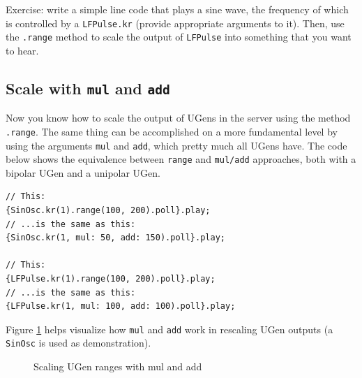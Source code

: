 Exercise: write a simple line code that plays a sine wave, the frequency of which is controlled by a \texttt{LFPulse.kr} (provide appropriate arguments to it). Then, use the \texttt{.range} method to scale the output of \texttt{LFPulse} into something that you want to hear. 

\subsection{Scale with \texttt{mul} and \texttt{add}}

Now you know how to scale the output of UGens in the server using the method \texttt{.range}. The same thing can be accomplished on a more fundamental level by using the arguments \texttt{mul} and \texttt{add}, which pretty much all UGens have. The code below shows the equivalence between \texttt{range} and \texttt{mul/add} approaches, both with a bipolar UGen and a unipolar UGen.

\begin{lstlisting}[style=SuperCollider-IDE, basicstyle=\scttfamily\footnotesize]
// This:
{SinOsc.kr(1).range(100, 200).poll}.play;
// ...is the same as this:
{SinOsc.kr(1, mul: 50, add: 150).poll}.play;

// This:
{LFPulse.kr(1).range(100, 200).poll}.play;
// ...is the same as this:
{LFPulse.kr(1, mul: 100, add: 100).poll}.play;
\end{lstlisting}

Figure \ref{fig:mul-add-scale} helps visualize how \texttt{mul} and \texttt{add} work in rescaling UGen outputs (a \texttt{SinOsc} is used as demonstration).

\begin{figure}[h!]
\centerline{}
\caption{Scaling UGen ranges with mul and add}
\label{fig:mul-add-scale}
\end{figure}

